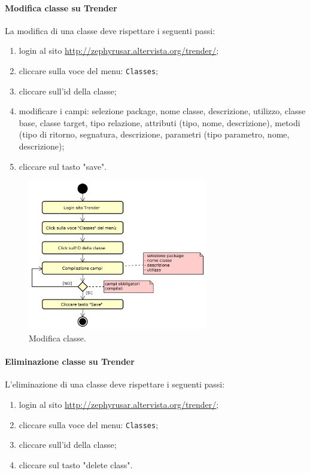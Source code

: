 		\paragraph{Modifica classe su Trender}
		La modifica di una classe deve rispettare i seguenti passi:
		\begin{enumerate}
			\item login al sito \url{http://zephyrusar.altervista.org/trender/};
			\item cliccare sulla voce del menu: \texttt{Classes};
			\item cliccare sull'id della classe;	
			\item modificare i campi: selezione package, nome classe, descrizione, utilizzo, classe base, classe target, tipo relazione, attributi (tipo, nome, descrizione), metodi (tipo di ritorno, segnatura, descrizione, parametri (tipo parametro, nome, descrizione);
			\item cliccare sul tasto "save".
		\end{enumerate}
		\begin{figure}[H]
			\centering
			\includegraphics[width=0.7\textwidth]{img/ModificaCl}
			\caption{Modifica classe.}
		\end{figure}
		
		\paragraph{Eliminazione classe su Trender}	
		L'eliminazione di una classe deve rispettare i seguenti passi:
		\begin{enumerate}
			\item login al sito \url{http://zephyrusar.altervista.org/trender/};
			\item cliccare sulla voce del menu: \texttt{Classes};
			\item cliccare sull'id della classe;
			\item cliccare sul tasto "delete class".
		\end{enumerate}
		
